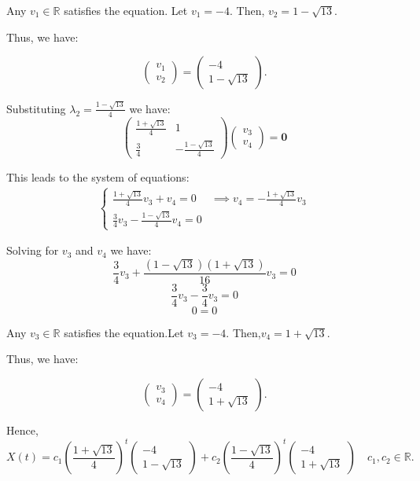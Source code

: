 \documentclass [a4paper]{article}
\begin{document}
Any \(v_1 \in \mathbb{R}\) satisfies the equation. Let \(v_1 = -4\).
Then, \(
v_2 = 1 - \sqrt{13}. 
\)

Thus, we have: 

\[
\begin{pmatrix} v_1 \\ v_2 \end{pmatrix} = \begin{pmatrix} -4 \\ 1 - \sqrt{13}\end{pmatrix}.
\]

Substituting \(\lambda_2 = \frac{1 - \sqrt{13}}{4}\) we have:
\[
\begin{pmatrix} \frac{1 + \sqrt{13}}{4} & 1 \\ \frac{3}{4} & -\frac{1 - \sqrt{13}}{4} \end{pmatrix} \begin{pmatrix} v_3 \\ v_4 \end{pmatrix} = \textbf{0}
\]

This leads to the system of equations:
\begin{align*}
\begin{cases}
\frac{1 + \sqrt{13}}{4} v_3 + v_4 = 0 & \implies v_4 = -\frac{1 + \sqrt{13}}{4} v_3 \\[1em]
\frac{3}{4} v_3 - \frac{1 - \sqrt{13}}{4} v_4 = 0 &
\end{cases}
\end{align*}

Solving for \(v_3\) and \(v_4\) we have: 
\[
\frac{3}{4} v_3 + \frac{(1 - \sqrt{13})(1 + \sqrt{13})}{16}v_3  = 0
\]
\[
\frac{3}{4} v_3 - \frac{3}{4} v_3 = 0
\]
\[0=0\]

Any \(v_3 \in \mathbb{R}\) satisfies the equation.Let \(v_3 = -4\).
Then,\(
v_4 = 1 + \sqrt{13} 
\).

Thus, we have: 

\[
\begin{pmatrix} v_3 \\ v_4 \end{pmatrix} = \begin{pmatrix} -4 \\ 1 + \sqrt{13}\end{pmatrix}.
\]

Hence, 
\[ X(t) = c_1{\left(\frac{1 + \sqrt{13}}{4}\right)}^t\begin{pmatrix}
    -4 \\ 1-\sqrt{13}
\end{pmatrix} + c_2{\left(\frac{1 - \sqrt{13}}{4}\right)}^t\begin{pmatrix}
    -4 \\ 1 +\sqrt{13}
\end{pmatrix} \quad c_1,c_2 \in \mathbb{R}.\]
\newpage
\end{document}
